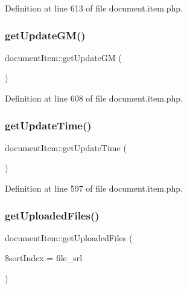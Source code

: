 Definition at line 613 of file document.\+item.\+php.

\mbox{\label{classdocumentItem_a6bb6ee1c20e63af811ebd2c6993e898f}} 
\subsubsection{\texorpdfstring{get\+Update\+G\+M()}{getUpdateGM()}}
{\footnotesize\ttfamily document\+Item\+::get\+Update\+GM (\begin{DoxyParamCaption}{ }\end{DoxyParamCaption})}



Definition at line 608 of file document.\+item.\+php.

\mbox{\label{classdocumentItem_a026c6426bea71f9ab86a4f4a7dcff6d9}} 
\subsubsection{\texorpdfstring{get\+Update\+Time()}{getUpdateTime()}}
{\footnotesize\ttfamily document\+Item\+::get\+Update\+Time (\begin{DoxyParamCaption}{ }\end{DoxyParamCaption})}



Definition at line 597 of file document.\+item.\+php.

\mbox{\label{classdocumentItem_a4ffff0d0a86cc44c6be0f46f644cdc42}} 
\subsubsection{\texorpdfstring{get\+Uploaded\+Files()}{getUploadedFiles()}}
{\footnotesize\ttfamily document\+Item\+::get\+Uploaded\+Files (\begin{DoxyParamCaption}\item[{}]{\$sort\+Index = {\ttfamily \textquotesingle{}file\+\_\+srl\textquotesingle{}} }\end{DoxyParamCaption})}



